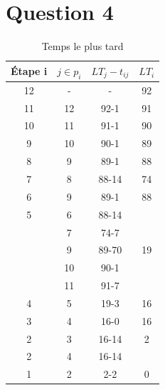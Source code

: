 \documentclass{article}
\begin{document}
\section*{Question 4}
\begin{table}
\caption{Temps le plus tard} \label{tab:Temps le plus tard}
    \begin{center}
        \begin{tabular}{|c|c|c|c|}
            \hline
            Étape i & $j \in p_i$ & $LT_j-t_{ij}$ & $LT_i$ \\
            \hline
            12       & -           & -             & 92     \\
            11       & 12          & 92-1          & 91     \\
            10       & 11          & 91-1          & 90     \\
            9        & 10          & 90-1          & 89     \\
            8        & 9           & 89-1          & 88     \\
            7        & 8           & 88-14         & 74     \\
            6        & 9           & 89-1          & 88     \\
            5        & 6           & 88-14         &        \\
                     & 7           & 74-7          &        \\
                     & 9           & 89-70         & 19     \\
                     & 10          & 90-1          &        \\
                     & 11          & 91-7          &        \\
            
            4        & 5           & 19-3          & 16     \\
            3        & 4           & 16-0          & 16     \\
            2        & 3           & 16-14         & 2      \\
            2        & 4           & 16-14         &        \\
            1        & 2           & 2-2           & 0      \\
            \hline
                                                     
                        
                                        
        \end{tabular}
        \end{center}
\end{table}
\end{document}
